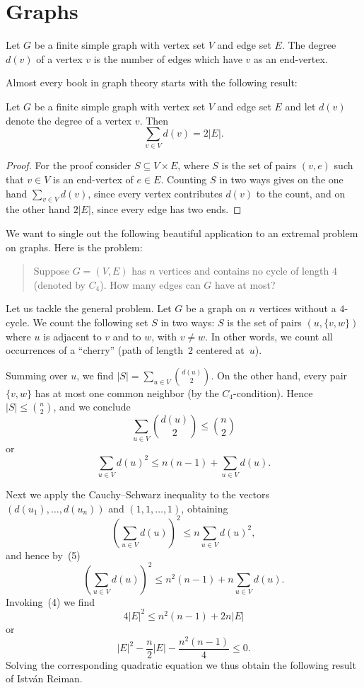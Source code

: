\section{Graphs}

Let $G$ be a finite simple graph with vertex set $V$ and edge set $E$. The
degree $d(v)$ of a vertex $v$ is the number of edges which have $v$ as an
end-vertex.

Almost every book in graph theory starts with the following result:

\begin{lemma}[Handshaking]
  \label{handshaking}
  \leanok
  Let $G$ be a finite simple graph with vertex set $V$ and edge set $E$ and let
  $d(v)$ denote the degree of a vertex $v$. Then
  \[
  \sum_{v\in V}d(v) = 2|E|. \tag{4}
  \]
\end{lemma}
\begin{proof}
  \leanok
  For the proof consider $S \subseteq V \times E$, where $S$ is
  the set of pairs $(v, e)$ such that $v \in V$ is an end-vertex
  of $e \in E$. Counting $S$ in two ways gives on the one hand
  $\sum_{v \in V} d(v)$, since every vertex contributes $d(v)$
  to the count, and on the other hand $2|E|$, since every edge
  has two ends.
\end{proof}

We want to single out the following beautiful application to an extremal problem
on graphs. Here is the problem:
\begin{quote}
Suppose $G = (V, E)$ has $n$ vertices and contains no cycle of length $4$ (denoted by $C_4$).
How many edges can $G$ have at most?
\end{quote}

Let us tackle the general problem. Let $G$ be a graph on $n$ vertices without
a $4$-cycle. We count the following set $S$ in two ways: $S$ is the set of pairs
$(u, \{v, w\})$ where $u$ is adjacent to $v$ and to $w$, with $v \neq w$.
In other words, we count all occurrences of a ``cherry'' (path of length~$2$ centered at~$u$).

Summing over $u$, we find $|S| = \sum_{u \in V} \binom{d(u)}{2}$. On the other hand,
every pair $\{v, w\}$ has at most one common neighbor (by the $C_4$-condition).
Hence $|S| \leq \binom{n}{2}$, and we conclude
\[
\sum_{u \in V} \binom{d(u)}{2} \leq \binom{n}{2}
\]
or
\[
\sum_{u \in V} d(u)^2 \leq n(n-1) + \sum_{u \in V} d(u). \tag{5}
\]

Next we apply the Cauchy--Schwarz inequality to the vectors $(d(u_1), \dots, d(u_n))$
and $(1, 1, \dots, 1)$, obtaining
\[
\left(\sum_{u \in V} d(u)\right)^2 \leq n \sum_{u \in V} d(u)^2,
\]
and hence by~(5)
\[
\left(\sum_{u \in V} d(u)\right)^2 \leq n^2(n-1) + n \sum_{u \in V} d(u).
\]
Invoking~(4) we find
\[
4|E|^2 \leq n^2(n-1) + 2n|E|
\]
or
\[
|E|^2 - \frac{n}{2}|E| - \frac{n^2(n-1)}{4} \leq 0.
\]
Solving the corresponding quadratic equation we thus obtain the following
result of Istv\'an Reiman.

